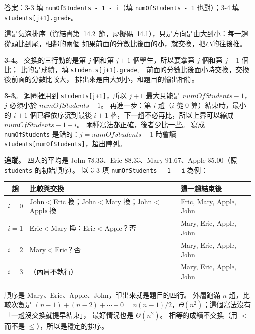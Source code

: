 \begin{pastsoln}
答案：3-3 填 \texttt{numOfStudents - 1 - i}（填 \texttt{numOfStudents - 1} 也對）；3-4 填
\texttt{students[j+1].grade}。

這是氣泡排序（資結書第~14.2~節，虛擬碼~14.1），只是方向是由大到小：每一趟從頭比到尾，相鄰的兩個
如果前面的分數比後面的\textbf{小}，就交換，把小的往後推。

\textbf{3-4}。 交換的三行動的是第 $j$ 個和第 $j + 1$ 個學生，所以要拿第 $j$ 個和第 $j + 1$ 個比；
比的是成績，填 \texttt{students[j+1].grade}。 前面的分數比後面小時交換，交換後前面的分數比較大，
排出來是由大到小，和題目的輸出相符。

\textbf{3-3}。 迴圈裡用到 \texttt{students[j+1]}，所以 $j + 1$ 最大只能是 $\mathit{numOfStudents} - 1$，
$j$ 必須小於 $\mathit{numOfStudents} - 1$。 再進一步：第 $i$ 趟（$i$ 從 $0$ 算）結束時，最小的
$i + 1$ 個已經依序沉到最後 $i + 1$ 格，下一趟不必再比，所以上界可以縮成
$\mathit{numOfStudents} - 1 - i$。 兩種寫法都正確，後者少比一些。 寫成 \texttt{numOfStudents}
是錯的：$j = \mathit{numOfStudents} - 1$ 時會讀 \texttt{students[numOfStudents]}，超出陣列。

\textbf{追蹤}。 四人的平均是 John $78.33$、Eric $88.33$、Mary $91.67$、Apple $85.00$（照
\texttt{students} 的初始順序）。 以 3-3 填 \texttt{numOfStudents - 1 - i} 為例：
\begin{center}
\small
\begin{tabular}{cll}
\toprule
趟 & 比較與交換 & 這一趟結束後 \\
\midrule
$i = 0$ & John$<$Eric 換；John$<$Mary 換；John$<$Apple 換 & Eric, Mary, Apple, John \\
$i = 1$ & Eric$<$Mary 換；Eric$<$Apple？否 & Mary, Eric, Apple, John \\
$i = 2$ & Mary$<$Eric？否 & Mary, Eric, Apple, John \\
$i = 3$ & （內層不執行） & Mary, Eric, Apple, John \\
\bottomrule
\end{tabular}
\end{center}
順序是 Mary、Eric、Apple、John，印出來就是題目的四行。 外層跑滿 $n$ 趟，比較次數是
$(n-1) + (n-2) + \cdots + 0 = n(n-1)/2$，$\Theta(n^2)$；這個寫法沒有「一趟沒交換就提早結束」，
最好情況也是 $\Theta(n^2)$。 相等的成績不交換（用 $<$ 而不是 $\le$），所以是穩定的排序。
\end{pastsoln}
